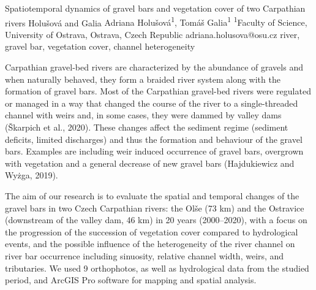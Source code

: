 \abstract
{Spatiotemporal dynamics of gravel bars and vegetation cover of two Carpathian rivers} 
{Holušová and Galia} 
{Adriana Holušová\textsuperscript{1}, Tomáš Galia\textsuperscript{1}} 
{\TLtag} 
{
\textsuperscript{1}Faculty of Science, University of Ostrava, Ostrava, Czech Republic
}
{adriana.holusova@osu.cz}  %
{river, gravel bar, vegetation cover, channel heterogeneity}
{Carpathian gravel-bed rivers are characterized by the abundance of gravels and when naturally behaved, they form a braided river system along with the formation of gravel bars. Most of the Carpathian gravel-bed rivers were regulated or managed in a way that changed the course of the river to a single-threaded channel with weirs and, in some cases, they were dammed by valley dams (Škarpich et al., 2020). These changes affect the sediment regime (sediment deficits, limited discharges) and thus the formation and behaviour of the gravel bars. Examples are including weir induced occurrence of gravel bars, overgrown with vegetation and a general decrease of new gravel bars (Hajdukiewicz and Wyżga, 2019).

The aim of our research is to evaluate the spatial and temporal changes of the gravel bars in two Czech Carpathian rivers: the Olše (73 km) and the Ostravice (downstream of the valley dam, 46 km) in 20 years (2000–2020), with a focus on the progression of the succession of vegetation cover compared to hydrological events, and the possible influence of the heterogeneity of the river channel on river bar occurrence including sinuosity, relative channel width, weirs, and tributaries. We used 9 orthophotos, as well as hydrological data from the studied period, and ArcGIS Pro software for mapping and spatial analysis. 

}

